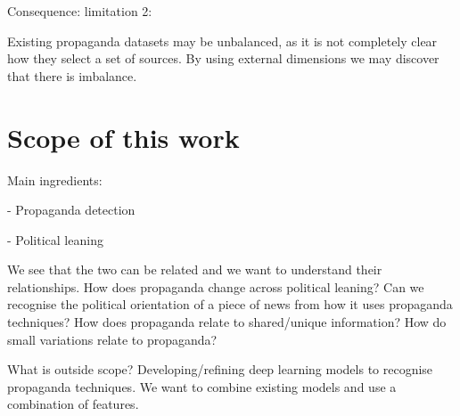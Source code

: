 Consequence: limitation 2:

Existing propaganda datasets may be unbalanced, as it is not completely clear how they select a set of sources. By using external dimensions we may discover that there is imbalance.

\section{\statusred Scope of this work}
\label{sec:lit_scope}

Main ingredients:

- Propaganda detection

- Political leaning

We see that the two can be related and we want to understand their relationships.
How does propaganda change across political leaning?
Can we recognise the political orientation of a piece of news from how it uses propaganda techniques?
How does propaganda relate to shared/unique information? How do small variations relate to propaganda?

What is outside scope?
Developing/refining deep learning models to recognise propaganda techniques. We want to combine existing models and use a combination of features.
